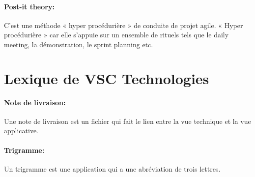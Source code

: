 \paragraph{Post-it theory: }
\label{lexi:post_it_theory}
C’est une méthode « hyper procédurière » de conduite de projet agile.
« Hyper procédurière » car elle s’appuie sur un ensemble de rituels tels que le daily meeting, la démonstration, le sprint planning etc.

\section{Lexique de VSC Technologies}

\paragraph{Note de livraison: }
\label{lexi:delivery_note}
Une note de livraison est un fichier qui fait le lien entre la vue technique et la vue applicative.

\paragraph{Trigramme: }
\label{lexi:trigramme}
Un trigramme est une application qui a une abréviation de trois lettres.
